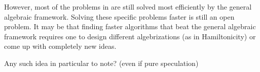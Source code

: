 However, most of the problems in  are still 
solved most efficiently by the general algebraic framework. Solving these 
specific problems faster 
is still an open problem. 
It may be that 
finding faster algorithms that beat the general algebraic framework requires 
one to design different algebrizations (as in Hamiltonicity) 
or come up with completely new ideas.

\begin{anamnote}[nomargin]{}
  Any such idea in particular to note?  (even if pure speculation)
\end{anamnote}
